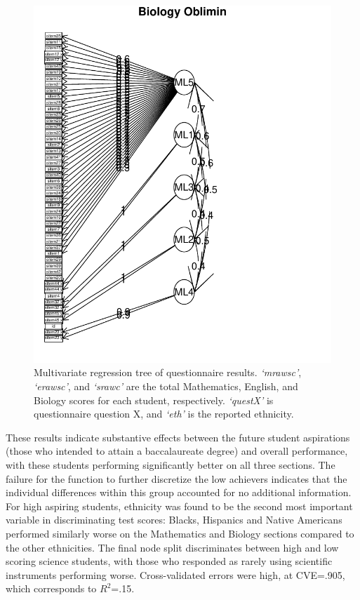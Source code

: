 \documentclass{article}\usepackage[]{graphicx}\usepackage[]{color}
\makeatletter
\def\maxwidth{ %
  \ifdim\Gin@nat@width>\linewidth
    \linewidth
  \else
    \Gin@nat@width
  \fi
}
\newenvironment{knitrout}{}{} %
\makeatother
\begin{document}
\begin{figure}[h]
\begin{knitrout}
\color{fgcolor}
\includegraphics[width=\maxwidth]{figure/unnamed-chunk-13} 

\end{knitrout}

\caption{Multivariate regression tree of questionnaire results. \emph{`mrawsc'}, \emph{`erawsc'}, and \emph{`srawc'} are the total Mathematics, English, and Biology scores for each student, respectively. \emph{`questX'} is questionnaire question X, and \emph{`eth'} is the reported ethnicity. }
\end{figure}

These results indicate substantive effects between the future student aspirations (those who intended to attain a baccalaureate degree) and overall performance, with these students performing significantly better on all three sections. The failure for the function to further discretize the low achievers indicates that the individual differences within this group accounted for no additional information. For high aspiring students, ethnicity was found to be the second most important variable in discriminating test scores: Blacks, Hispanics and Native Americans performed similarly worse on the Mathematics and Biology sections compared to the other ethnicities. The final node split discriminates between high and low scoring science students, with those who responded as rarely using scientific instruments performing worse. Cross-validated errors were high, at CVE=.905, which corresponds to $R^2$=.15.
\end{document}
